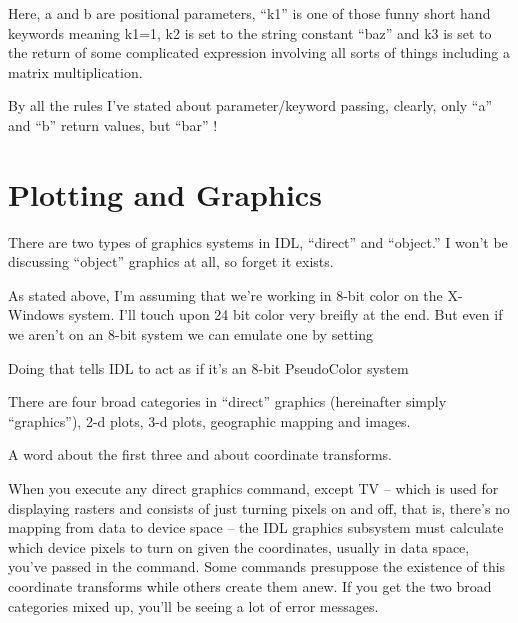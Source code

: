 \begin{itemize}

   Here, a and b are positional parameters, ``k1'' is one of those
   funny short hand keywords meaning k1=1, k2 is set to the string constant
  ``baz'' and k3 is set to the return of some complicated expression
   involving all sorts of things including a matrix multiplication.

  By all the rules I've stated about parameter/keyword passing,
  clearly, only ``a'' and ``b''  return values, but ``bar''
    !

  \end{itemize}



\section{Plotting and Graphics}\label{sec:qs-Plotting}

   
   

   There are two types of graphics systems in IDL, ``direct'' and
  ``object.'' I won't be discussing ``object'' graphics at all, so forget
  it exists.

  As stated above, I'm assuming that we're working in 8-bit color on
  the X-Windows system. I'll touch upon 24 bit color very breifly at
  the end. But even if we aren't on an 8-bit system we can emulate one
  by setting 


  Doing that tells IDL to act as if it's an 8-bit PseudoColor system


  There are four broad categories in ``direct'' graphics (hereinafter
  simply ``graphics''), 2-d plots, 3-d plots, geographic mapping and
  images.

  A word about the first three and about coordinate transforms.

  When you execute any direct graphics command, except
  TV -- which is used for displaying rasters and
  consists of just turning pixels on and off, that is, there's no
  mapping from data to device space -- the IDL graphics subsystem must
  calculate which device pixels to turn on given the coordinates,
  usually in data space, you've passed in the command. Some commands
  presuppose the existence of this coordinate transforms while others
  create them anew. If you get the two broad categories mixed up, you'll
  be seeing a lot of error messages.

